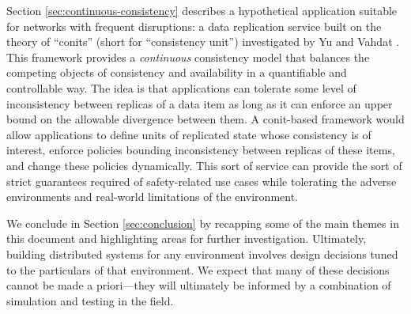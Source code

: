 \documentclass[]             %
{NASA}                       %
\theoremstyle{definition}
\begin{document}
Section \ref{sec:continuous-consistency} describes a hypothetical
application suitable for networks with frequent disruptions: a data
replication service built on the theory of ``conits'' (short for
``consistency unit'') investigated by Yu and Vahdat
\cite{2002tact}. This framework provides a \emph{continuous}
consistency model that balances the competing objects of consistency
and availability in a quantifiable and controllable way. The idea is
that applications can tolerate some level of inconsistency between
replicas of a data item as long as it can enforce an upper bound on
the allowable divergence between them. A conit-based framework would
allow applications to define units of replicated state whose
consistency is of interest, enforce policies bounding inconsistency
between replicas of these items, and change these policies
dynamically. This sort of service can provide the sort of strict
guarantees required of safety-related use cases while tolerating the
adverse environments and real-world limitations of the environment.

We conclude in Section \ref{sec:conclusion} by recapping some of the
main themes in this document and highlighting areas for further
investigation. Ultimately, building distributed systems for any
environment involves design decisions tuned to the particulars of that
environment. We expect that many of these decisions cannot be made a
priori---they will ultimately be informed by a combination of
simulation and testing in the field.

\end{document}
